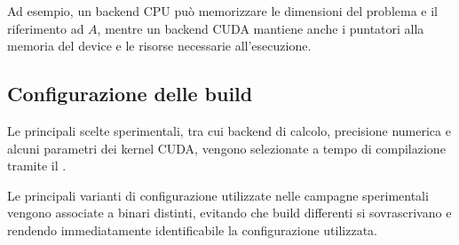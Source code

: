 Ad esempio, un backend CPU può memorizzare le dimensioni del problema
e il riferimento ad $A$, mentre un backend CUDA mantiene anche i
puntatori alla memoria del device e le risorse necessarie
all'esecuzione.

\subsection{Configurazione delle build}

Le principali scelte sperimentali, tra cui backend di calcolo,
precisione numerica e alcuni parametri dei kernel CUDA, vengono
selezionate a tempo di compilazione tramite il .

Le principali varianti di configurazione utilizzate nelle campagne
sperimentali vengono associate a binari distinti, evitando che build
differenti si sovrascrivano e rendendo immediatamente identificabile
la configurazione utilizzata.